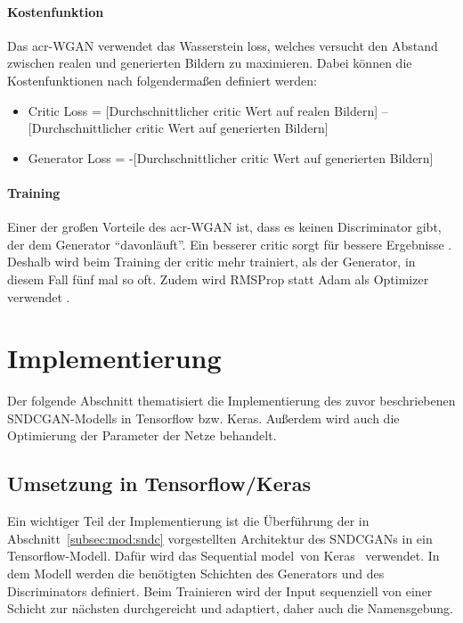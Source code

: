  \paragraph{Kostenfunktion} Das \gls{acr-WGAN} verwendet das Wasserstein loss,
 welches versucht den Abstand zwischen realen und generierten Bildern zu
 maximieren. Dabei können die Kostenfunktionen nach \cite{brownlee_how_2019}
 folgendermaßen definiert werden:
 \begin{itemize}
 	\item Critic Loss = [Durchschnittlicher critic Wert auf realen Bildern] –
 	[Durchschnittlicher critic Wert auf generierten Bildern]
 	\item Generator Loss = -[Durchschnittlicher critic Wert auf generierten
 	Bildern]
 \end{itemize}

\paragraph{Training} Einer der großen Vorteile des \gls{acr-WGAN} ist, dass es
keinen Discriminator gibt, der dem Generator \enquote{davonläuft}. Ein besserer
critic sorgt für bessere Ergebnisse \cite[S. 8]{arjovsky_wasserstein_2017}.
Deshalb wird beim Training der critic mehr trainiert, als der Generator, in
diesem Fall fünf mal so oft. Zudem wird RMSProp statt Adam als Optimizer
verwendet \cite[S. 12]{arjovsky2017wasserstein}.
 
  \section{Implementierung} %
  \label{sec:gen_impl}
 
 Der folgende Abschnitt thematisiert die Implementierung des zuvor beschriebenen
 SNDCGAN-Modells in Tensorflow bzw. Keras. Außerdem wird auch die Optimierung
 der Parameter der Netze behandelt.
 
 \subsection{Umsetzung in Tensorflow/Keras}\label{subsec:imp:sndc}
 
 Ein wichtiger Teil der Implementierung ist die Überführung der in
 Abschnitt~\ref{subsec:mod:sndc} vorgestellten Architektur des SNDCGANs in ein
 Tensorflow-Modell. Dafür wird das \glqq Sequential model\grqq\ von
 Keras~\cite{keras:SequentialModel} verwendet. In dem Modell werden die
 benötigten Schichten des Generators und des Discriminators definiert. Beim
 Trainieren wird der Input sequenziell von einer Schicht zur nächsten
 durchgereicht und adaptiert, daher auch die Namensgebung.  
 
